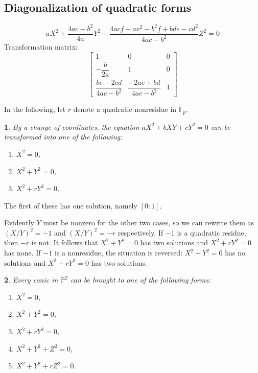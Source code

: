 \documentclass[10pt,a4paper]{amsart}
\numberwithin{equation}{section}
\numberwithin{figure}{section}
\theoremstyle{definition}
\theoremstyle{remark}
\theoremstyle{plain}
\theoremstyle{plain}
\theoremstyle{definition}
\theoremstyle{plain}
\theoremstyle{plain}
\newtheorem{lem}{\protect\lemmaname}[section]
\providecommand{\lemmaname}{Lemma}
\begin{document}
\subsection{Diagonalization of quadratic forms}
\color{blue}
\[
	aX^2 + \frac{4ac - b^2}{4a}Y^2 + \frac{4acf - ae^2 - 
	b^2 f + bde - cd^2}{4ac - b^2}Z^2 = 0
\]
Transformation matrix:
\[
	\begin{bmatrix}
		1 & 0 & 0\\
		-\dfrac{b}{2a} & 1 & 0\\
		\dfrac{be - 2cd}{4ac - b^2} & \dfrac{-2ae + bd}{4ac - b^2} & 1
	\end{bmatrix}
\]
\color{black}

In the following, let $r$ denote a quadratic nonresidue in $\mathbb{F}_p$.
\begin{lem}\label{lem:quadrics-P1}
	By a change of coordinates, the equation $aX^2 + bXY + cY^2 = 0$ can be transformed into one of the following:
	\begin{enumerate}
		\item $X^2 = 0$,
		\item $X^2 + Y^2 = 0$, \label{case:x^2+y^2=0}
		\item $X^2 + rY^2 = 0$.
	\end{enumerate}
\end{lem}

The first of these has one solution, namely $[0:1]$.

Evidently $Y$ must be nonzero for the other two cases, so we can rewrite them as $(X/Y)^2 = -1$ and $(X/Y)^2 = -r$ respectively. If $-1$ is a quadratic residue, then $-r$ is not. It follows that $X^2 + Y^2 = 0$ has two solutions and $X^2 + rY^2 = 0$ has none. If $-1$ is a nonresidue, the situation is reversed: $X^2 + Y^2 = 0$ has no solutions and $X^2 + rY^2 = 0$ has two solutions.

\begin{lem}
	Every conic in $\mathbb{P}^2$ can be brought to one of the following forms:
	\begin{enumerate}
		\item $X^2 = 0$,
		\item $X^2 + Y^2 = 0$,
		\item $X^2 + rY^2 = 0$,
		\item $X^2 + Y^2 + Z^2 = 0$,
		\item $X^2 + Y^2 + rZ^2 = 0$.
	\end{enumerate}
\end{lem}
\end{document}
